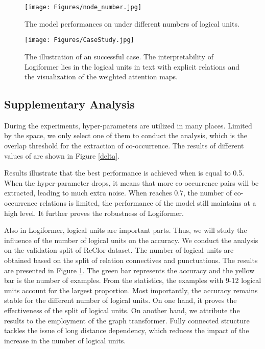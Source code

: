 \documentclass[sigconf]{acmart}
\begin{document}
\begin{figure}[t]
	\large
	\centering
	\texttt{[image: Figures/node\_number.jpg]}
	\vspace{-0.3cm}
	\caption{The model performances on under different numbers of logical units.}
	\label{nodenum}
	\vspace{-0.5cm}
\end{figure}

\begin{figure*}[t]
	\large
	\centering
	\texttt{[image: Figures/CaseStudy.jpg]}
	\caption{The illustration of an successful case. The interpretability of Logiformer lies in the logical units in text with explicit relations and the visualization of the weighted attention maps.}
	\label{casestudy}
\end{figure*}

\vspace{-0.3cm}
\subsection{Supplementary Analysis}
During the experiments, hyper-parameters are utilized in many places. Limited by the space, we only select one of them to conduct the analysis, which is the overlap threshold  for the extraction of co-occurrence. The results of different values of  are shown in Figure \ref{delta}.

Results illustrate that the best performance is achieved when  is equal to 0.5. When the hyper-parameter  drops, it means that more co-occurrence pairs will be extracted, leading to much extra noise. When  reaches 0.7, the number of co-occurrence relations is limited, the performance of the model still maintains at a high level. It further proves the robustness of Logiformer.

Also in Logiformer, logical units are important parts. Thus, we will study the influence of the number of logical units on the accuracy. We conduct the analysis on the validation split of ReClor dataset. The number of logical units are obtained based on the split of relation connectives and punctuations. The results are presented in Figure \ref{nodenum}. The green bar represents the accuracy and the yellow bar is the number of examples. From the statistics, the examples with 9-12 logical units account for the largest proportion. Most importantly, the accuracy remains stable for the different number of logical units. On one hand, it proves the effectiveness of the split of logical units. On another hand, we attribute the results to the employment of the graph transformer. Fully connected structure tackles the issue of long distance dependency, which reduces the impact of the increase in the number of logical units.
\end{document}
